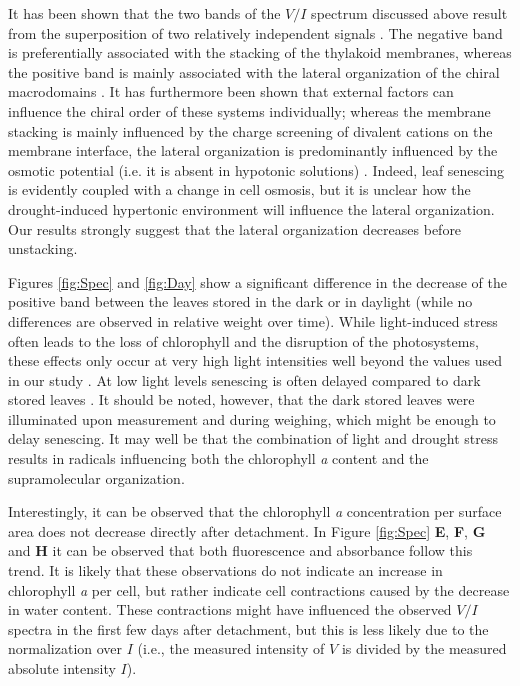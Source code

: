 \documentclass[review]{elsarticle}
\begin{document}
It has been shown that the two bands of the $V/I$ spectrum discussed above result from the superposition of two relatively independent signals \cite{Finzi1989}. The negative band is preferentially associated with the stacking of the thylakoid membranes, whereas the positive band is mainly associated with the lateral organization of the chiral macrodomains \cite{Cseh2000, Dobrikova2003, Jajoo2012, Garab1991}. It has furthermore been shown that external factors can influence the chiral order of these systems individually; whereas the membrane stacking is mainly influenced by the charge screening of divalent cations on the membrane interface, the lateral organization is predominantly influenced by the osmotic potential (i.e. it is absent in hypotonic solutions) \cite{Garab1991}. Indeed, leaf senescing is evidently coupled with a change in cell osmosis, but it is unclear how the drought-induced hypertonic environment will influence the lateral organization. Our results strongly suggest that the lateral organization decreases before unstacking. 

Figures \ref{fig:Spec} and \ref{fig:Day} show a significant difference in the decrease of the positive band between the leaves stored in the dark or in daylight (while no differences are observed in relative weight over time). While light-induced stress often leads to the loss of chlorophyll and the disruption of the photosystems, these effects only occur at very high light intensities well beyond the values used in our study \cite{Okada1992}. At low light levels senescing is often delayed compared to dark stored leaves \cite{Okada1992}. It should be noted, however, that the dark stored leaves were illuminated upon measurement and during weighing, which might be enough to delay senescing. It may well be that the combination of light and drought stress results in radicals influencing both the chlorophyll \textit{a} content and the supramolecular organization. 

Interestingly, it can be observed that the chlorophyll \textit{a} concentration per surface area does not decrease directly after detachment. In Figure \ref{fig:Spec} \textbf{E}, \textbf{F}, \textbf{G} and \textbf{H} it can be observed that both fluorescence and absorbance follow this trend. It is likely that these observations do not indicate an increase in chlorophyll \textit{a} per cell, but rather indicate cell contractions caused by the decrease in water content. These contractions might have influenced the observed $V/I$ spectra in the first few days after detachment, but this is less likely due to the normalization over $I$ (i.e., the measured intensity of $V$ is divided by the measured absolute intensity $I$).
\end{document}
